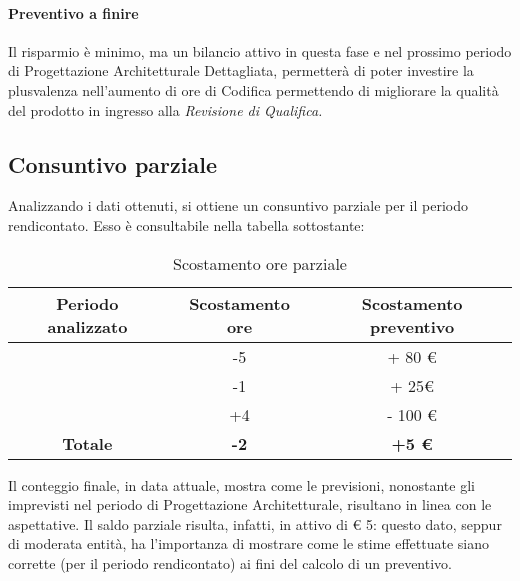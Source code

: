 \paragraph{Preventivo a finire}
Il risparmio è minimo, ma un bilancio attivo in questa fase e nel prossimo periodo di Progettazione Architetturale Dettagliata, permetterà di poter investire la plusvalenza nell'aumento di ore di Codifica permettendo di migliorare la qualità del prodotto in ingresso alla \textit{Revisione di Qualifica.}


\subsection{Consuntivo parziale}

Analizzando i dati ottenuti, si ottiene un consuntivo parziale per il periodo rendicontato. Esso è consultabile nella tabella sottostante:

\begin{table}[H]
	\begin{center}
		\begin{tabular}{|c|c|c|}
			\hline
			\textbf{Periodo analizzato}	& \textbf{Scostamento ore}	& \textbf{Scostamento preventivo} \\
			\hline
			\AdR	&	-5	&	+ 80 €	\\
			\hline
			\ARD	&	-1	&	+ 25€	\\
			\hline
			\PA   &		+4  &	- 100 €	\\
			\hline
			\textbf{Totale} & \textbf{-2} & \textbf{+5 €} \\
			\hline
		\end{tabular}
	\end{center}
	\caption{Scostamento ore parziale}
\end{table}

Il conteggio finale, in data attuale, mostra come le previsioni, nonostante gli imprevisti nel periodo di Progettazione Architetturale, risultano in linea con le aspettative. Il saldo parziale risulta, infatti, in attivo di € 5: questo dato, seppur di moderata entità, ha l'importanza di mostrare come le stime effettuate siano corrette (per il periodo rendicontato) ai fini del calcolo di un preventivo.